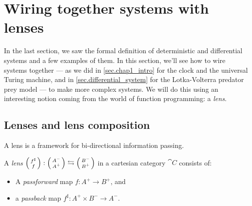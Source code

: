\documentclass[DynamicalBook]{subfiles}
\begin{document}
\section{Wiring together systems with lenses}\label{sec.wiring_discrete_systems}

In the last section, we saw the formal definition of deterministic and
differential systems and a
few examples of them. In this section, we'll see how to wire systems
together --- as we did in \cref{sec.chap1_intro} for the clock and the universal
Turing machine, and in \cref{sec.differential_system} for the Lotka-Volterra
predator prey model --- to
make more complex systems. We will do this using an interesting notion coming
from the world of function programming: a \emph{lens}.

\subsection{Lenses and lens composition}\label{sec.lens_discrete}

A lens is a framework for bi-directional information passing.

\begin{definition}\label{def.lens}
  A \emph{lens} $\lens{f^{\sharp}}{f} : \lens{A^-}{A^+} \leftrightarrows
  \lens{B^-}{B^+}$ in a cartesian category $\cat{C}$ consists of:
  \begin{itemize}
  \item A \emph{passforward} map $f : A^+ \to B^+$, and
    \item a \emph{passback} map $f^{\sharp} : A^+ \times B^- \to A^-$.
  \end{itemize}
\end{definition}
\end{document}
